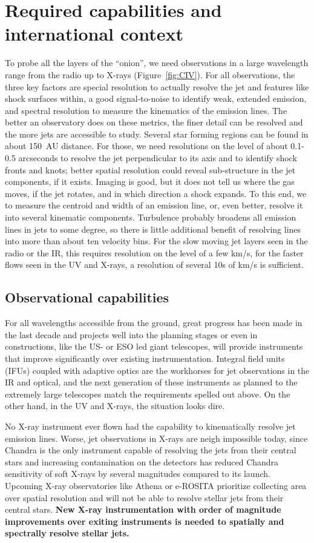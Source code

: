 \documentclass[12pt]{article}
\begin{document}
\section{Required capabilities and international context}
To probe all the layers of the ``onion'', we need observations in a large
wavelength range from the radio up to X-rays (Figure~\ref{fig:CIV}). For all observations, the three
key factors are special resolution to actually resolve the jet and features
like shock surfaces within, a good signal-to-noise to identify weak, extended
emission, and spectral resolution to measure the kinematics of the emission
lines. The better an observatory does on these metrics, the finer detail can be
resolved and the more jets are accessible to study. Several star forming
regions can be found in about 150~AU distance. For those, we need resolutions
on the level of about 0.1-0.5 arcseconds to resolve the jet perpendicular to
its axis and to identify shock fronts and knots; better spatial resolution
could reveal sub-structure in the jet components, if it exists. Imaging is
good, but it does not tell us where the gas moves, if the jet rotates, and in
which direction a shock expands. To this end, we to measure the centroid and
width of an emission line, or, even better, resolve it into several kinematic
components. Turbulence probably broadens all emission lines in jets to some
degree, so there is little additional benefit of resolving lines into more than
about ten velocity bins. For the slow moving jet layers seen in the radio or the IR, this requires resolution on the level of a few km/s, for the faster flows seen in the UV and X-rays, a resolution of several 10s of km/s is sufficient.

\subsection{Observational capabilities}
For all wavelengths accessible from the ground, great progress has been made in the last decade and projects well into the planning stages or even in constructions, like the US- or ESO led giant telescopes, will provide instruments that improve significantly over existing instrumentation. Integral field units (IFUs) coupled with adaptive optics are the workhorses for jet observations in the IR and optical, and the next generation of these instruments as planned to the extremely large telescopes match the requirements spelled out above. On the other hand, in the UV and X-rays, the situation looks dire. 

No X-ray instrument ever flown had the capability to kinematically resolve jet emission lines. Worse, jet observations in X-rays are neigh impossible today, since Chandra is the only instrument capable of resolving the jets from their central stars and increasing contamination on the detectors has reduced Chandra sensitivity of soft X-rays by several magnitudes compared to its launch. Upcoming X-ray observatories like Athena or e-ROSITA prioritize collecting area over spatial resolution and will not be able to resolve stellar jets from their central stars. \textbf{New X-ray instrumentation with order of magnitude improvements over exiting instruments is needed to spatially and spectrally resolve stellar jets.}
\end{document}
